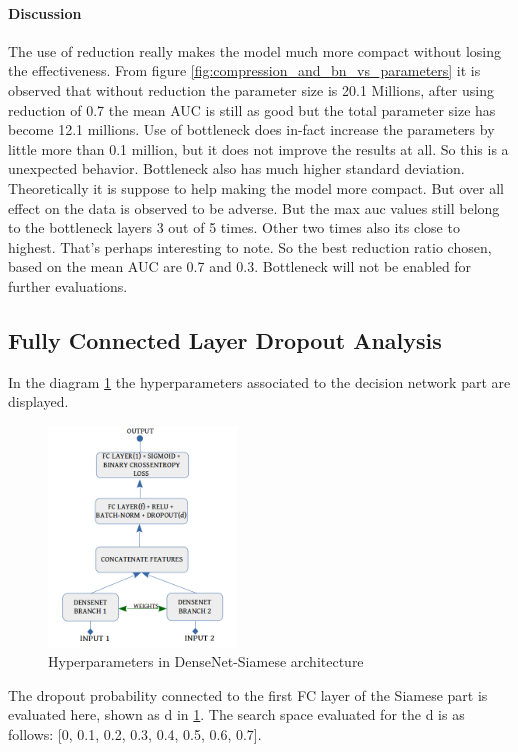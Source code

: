 \paragraph{Discussion\\}
The use of reduction really makes the model much more compact without losing the effectiveness. From figure \ref{fig:compression_and_bn_vs_parameters} it is observed that without reduction the parameter size is 20.1 Millions, 
after using reduction of 0.7 the mean AUC is still as good but the total parameter size has become 12.1 millions. Use of bottleneck does in-fact increase the parameters by little more than 0.1 million, but it does not improve the 
results at all. So this is a unexpected behavior. Bottleneck also has much higher standard deviation. Theoretically it is suppose to help making the model more compact. But over all effect on the data is observed to be adverse.
But the max auc values still belong to the bottleneck layers 3 out of 5 times. Other two times also its close to highest. That's perhaps interesting to note. So the best reduction ratio chosen, based on the mean AUC are 0.7 and 0.3.
Bottleneck will not be enabled for further evaluations.

\subsection{Fully Connected Layer Dropout Analysis}
In the diagram \ref{fig:siamese_densenet_structure_wraped} the hyperparameters associated to the decision network part are displayed. 

\begin{figure}
\includegraphics[width=5cm]{images/densenet/siamese_densenet_structure}
\caption{Hyperparameters in DenseNet-Siamese architecture}
\label{fig:siamese_densenet_structure_wraped}
\end{figure} 

The dropout probability connected to the first FC layer of the Siamese part is evaluated here, shown as d in \ref{fig:siamese_densenet_structure_wraped}. The search space evaluated for the d is as follows: [0, 0.1, 0.2, 0.3, 0.4, 0.5, 0.6, 0.7].

